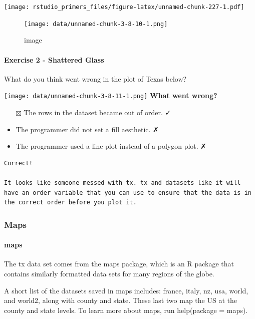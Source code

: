 \documentclass[
]{article}
\providecommand{\tightlist}{%
  \setlength{\itemsep}{0pt}\setlength{\parskip}{0pt}}
\begin{document}
\texttt{[image: rstudio\_primers\_files/figure-latex/unnamed-chunk-227-1.pdf]}

\begin{figure}
\centering
\texttt{[image: data/unnamed-chunk-3-8-10-1.png]}
\caption{image}
\end{figure}

\hypertarget{exercise-2---shattered-glass}{%
\paragraph{Exercise 2 - Shattered
Glass}\label{exercise-2---shattered-glass}}

What do you think went wrong in the plot of Texas below?

\texttt{[image: data/unnamed-chunk-3-8-11-1.png]} \textbf{What went
wrong?}

\begin{itemize}
\tightlist
\item[$\boxtimes$]
  The rows in the dataset became out of order. ✓
\item
  The programmer did not set a fill aesthetic. ✗
\item
  The programmer used a line plot instead of a polygon plot. ✗
\end{itemize}

\begin{verbatim}
Correct!

It looks like someone messed with tx. tx and datasets like it will have an order variable that you can use to ensure that the data is in the correct order before you plot it.
\end{verbatim}

\hypertarget{maps}{%
\subsubsection{Maps}\label{maps}}

\hypertarget{maps-1}{%
\paragraph{maps}\label{maps-1}}

The tx data set comes from the maps package, which is an R package that
contains similarly formatted data sets for many regions of the globe.

A short list of the datasets saved in maps includes: france, italy, nz,
usa, world, and world2, along with county and state. These last two map
the US at the county and state levels. To learn more about maps, run
help(package = maps).
\end{document}

